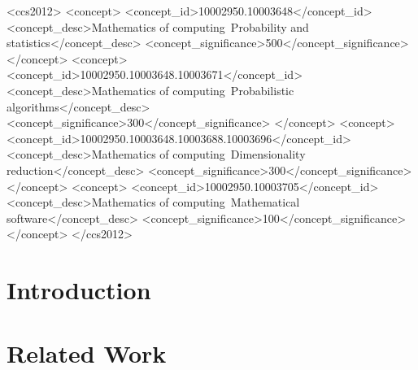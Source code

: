 \documentclass[sigconf]{acmart}  %
\begin{document}
\begin{CCSXML}
<ccs2012>
<concept>
<concept_id>10002950.10003648</concept_id>
<concept_desc>Mathematics of computing~Probability and statistics</concept_desc>
<concept_significance>500</concept_significance>
</concept>
<concept>
<concept_id>10002950.10003648.10003671</concept_id>
<concept_desc>Mathematics of computing~Probabilistic algorithms</concept_desc>
<concept_significance>300</concept_significance>
</concept>
<concept>
<concept_id>10002950.10003648.10003688.10003696</concept_id>
<concept_desc>Mathematics of computing~Dimensionality reduction</concept_desc>
<concept_significance>300</concept_significance>
</concept>
<concept>
<concept_id>10002950.10003705</concept_id>
<concept_desc>Mathematics of computing~Mathematical software</concept_desc>
<concept_significance>100</concept_significance>
</concept>
</ccs2012>
\end{CCSXML}



\maketitle

\section{Introduction} \label{sec:intro}




% 

\section{Related Work} \label{sec:relatedWork}
\end{document}
